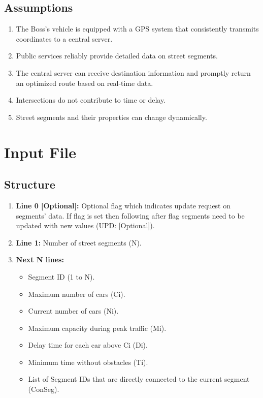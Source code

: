 \documentclass[a4paper, 12pt]{article}
\begin{document}
\subsection*{Assumptions}
\begin{enumerate}
	\item The Boss's vehicle is equipped with a GPS system that consistently transmits coordinates to a central server.
	\item Public services reliably provide detailed data on street segments.
	\item The central server can receive destination information and promptly return an optimized route based on real-time data.
	\item Intersections do not contribute to time or delay.
	\item Street segments and their properties can change dynamically.
\end{enumerate}

\section*{Input File}

\subsection*{Structure}
\begin{enumerate}
	\item \textbf{Line 0 [Optional]:} Optional flag which indicates update request on segments' data. If flag is set then following after flag segments need to be updated with new values (UPD: [Optional]).
	\item \textbf{Line 1:} Number of street segments (N).
	\item \textbf{Next N lines:}
	\begin{itemize}
		\item Segment ID (1 to N).
		\item Maximum number of cars (Ci).
		\item Current number of cars (Ni).
		\item Maximum capacity during peak traffic (Mi).
		\item Delay time for each car above Ci (Di).
		\item Minimum time without obstacles (Ti).
		\item List of Segment IDs that are directly connected to the current segment (ConSeg).
	\end{itemize}
\end{enumerate}
\end{document}
